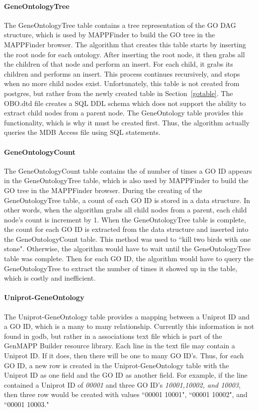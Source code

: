 \paragraph{GeneOntologyTree}
The GeneOntologyTree table contains a tree representation of the GO DAG structure, which is used by MAPPFinder
to build the GO tree in the MAPPFinder browser. The algorithm that creates this table starts by inserting the root
node for each ontology. After inserting the root node, it then grabs all the children of that node and perform an insert.
For each child, it grabs its children
and performs an insert. This process continues recursively, and stops when no more child nodes exist.
Unfortunately, this table is not created from postgres, but rather from the
newly created table in Section~\ref{gotable}. The OBO.dtd file creates a SQL DDL schema which does not support
the ability to extract child nodes from a parent node. The GeneOntology table provides this functionality, which
is why it must be created first. Thus, the algorithm actually queries the MDB Access file using SQL statements.


\paragraph{GeneOntologyCount}
The GeneOntologyCount table contains the of number of times a GO ID appears in the GeneOntologyTree table, which
is also used by MAPPFinder to build the GO tree in the MAPPFinder browser. During the creating of the GeneOntologyTree
table, a count of each GO ID is stored in a data structure. In other words, when the algorithm grabs all child nodes from
a parent, each child node's count is increment by 1. When the GeneOntologyTree table is complete, the count for
each GO ID is extracted from the data structure and inserted into the GeneOntologyCount table.
This method was used to ``kill two birds with one stone". Otherwise,
the algorithm would have to wait until the GeneOntologyTree table was complete. Then for each GO ID, the algorithm would have
to query the GeneOntologyTree to extract the number of times it showed up in the table, which is costly and inefficient.


\paragraph{Uniprot-GeneOntology}
The Uniprot-GeneOntology table provides a mapping between a Uniprot ID and a GO ID, which is a many to many relationship.
Currently this information is not found in godb, but rather in a associations text file which is part of the GenMAPP Builder
resource library. Each line in the text file may contain a Uniprot ID. If it does, then there will be one to many GO ID's.
Thus, for each GO ID, a new row is created in the Uniprot-GeneOntology table with the Uniprot ID as one field and the GO ID
as another field. For example, if the line contained a Uniprot ID of \emph{00001} and three GO ID's \emph{10001,10002, and 10003},
then three row would be created with values ``00001 10001", ``00001 10002", and ``00001 10003."

